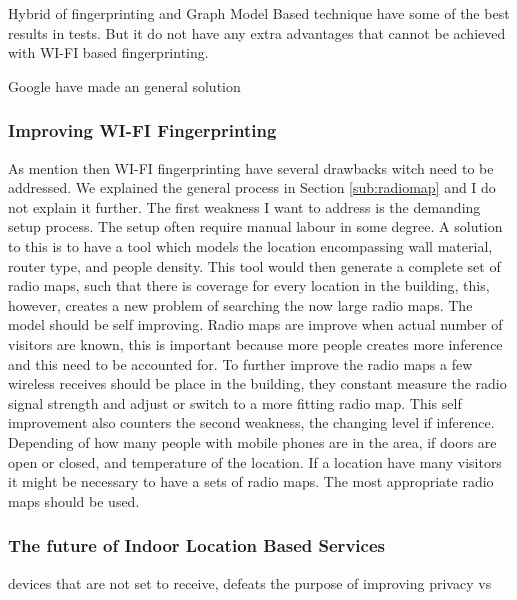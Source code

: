 Hybrid of fingerprinting and Graph Model Based technique have some of the best results in tests. 
But it do not have any extra advantages that cannot be achieved with WI-FI based fingerprinting.

Google have made an general solution 

\subsubsection{\qquad Improving WI-FI Fingerprinting} 
As mention then WI-FI fingerprinting have several drawbacks witch need to be addressed.
We explained the general process in Section \ref{sub:radiomap} and I do not explain it further.
The first weakness I want to address is the demanding setup process.
The setup often require manual labour in some degree.
A solution to this is to have a tool which models the location encompassing wall material, router type, and people density. 
This tool would then generate a complete set of radio maps, such that there is coverage for every location in the building, this, however, creates a new problem of searching the now large radio maps. 
The model should be self improving. 
Radio maps are improve when actual number of visitors are known, this is important because more people creates more inference and this need to be accounted for. 
To further improve the radio maps a few wireless receives should be place in the building, they constant measure the radio signal strength and adjust or switch to a more fitting radio map.
This self improvement also counters the second weakness, the changing level if inference.
Depending of how many people with mobile phones are in the area, if doors are open or closed, and temperature of the location.
If a location have many visitors it might be necessary to have a sets of radio maps.
The most appropriate radio maps should be used.

\subsubsection{\qquad The future of Indoor Location Based Services}


devices that are not set to receive, defeats the purpose of improving 
privacy vs 

